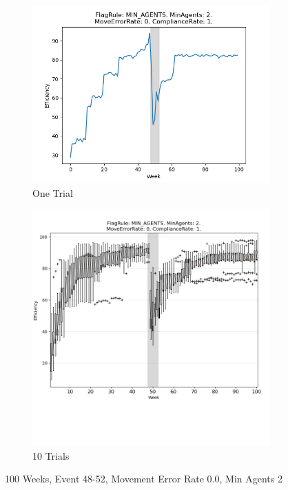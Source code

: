 \documentclass{article}%
\begin{document}
\begin{figure}[!htb]%
\begin{subfigure}[b]{0.45\linewidth}%
\includegraphics[width=\linewidth]{0003fr_MIN_AGENTS_ma_2_er_0_cr_1_t1.png}%
\caption{One Trial}%
\end{subfigure}%
\begin{subfigure}[b]{0.45\linewidth}%
\includegraphics[clip,width=\linewidth,trim=0 4cm 0 0]{0003fr_MIN_AGENTS_ma_2_er_0_cr_1_t10.png}%
\caption{10 Trials}%
\end{subfigure}%
\caption{100 Weeks, Event 48{-}52, Movement Error Rate 0.0, Min Agents 2}%
\end{figure}
\end{document}
